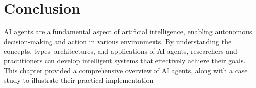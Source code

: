 \section{Conclusion}
AI agents are a fundamental aspect of artificial intelligence, enabling autonomous decision-making and action in various environments. By understanding the concepts, types, architectures, and applications of AI agents, researchers and practitioners can develop intelligent systems that effectively achieve their goals. This chapter provided a comprehensive overview of AI agents, along with a case study to illustrate their practical implementation.


% 
% 